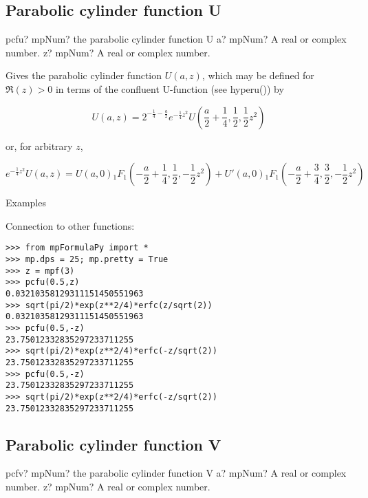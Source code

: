 \subsection{Parabolic cylinder function U}

\begin{mpFunctionsExtract}
	\mpFunctionTwo
	{pcfu? mpNum? the parabolic cylinder function U}
	{a? mpNum? A real or complex number.}
	{z? mpNum? A real or complex number.}	
\end{mpFunctionsExtract}


\vpara
Gives the parabolic cylinder function $U(a, z)$, which may be defined for $\Re(z)>0$ in terms of the confluent U-function (see hyperu()) by

\begin{equation}
U(a, z) = 2^{-\frac{1}{4}-\frac{a}{2}} e^{-\frac{1}{4}z^2} U\left(\frac{a}{2} + \frac{1}{4}, \frac{1}{2}, \frac{1}{2}z^2 \right)
\end{equation}

or, for arbitrary $z$,

\begin{equation}
e^{-\frac{1}{4}z^2} U(a, z) = U(a, 0) {}_1F_1\left(-\frac{a}{2} + \frac{1}{4}, \frac{1}{2}, -\frac{1}{2}z^2 \right) + U'(a, 0 ){}_1F_1\left(-\frac{a}{2} + \frac{3}{4}, \frac{3}{2}, -\frac{1}{2}z^2 \right)
\end{equation}


Examples

Connection to other functions:

\begin{lstlisting}
>>> from mpFormulaPy import *
>>> mp.dps = 25; mp.pretty = True
>>> z = mpf(3)
>>> pcfu(0.5,z)
0.03210358129311151450551963
>>> sqrt(pi/2)*exp(z**2/4)*erfc(z/sqrt(2))
0.03210358129311151450551963
>>> pcfu(0.5,-z)
23.75012332835297233711255
>>> sqrt(pi/2)*exp(z**2/4)*erfc(-z/sqrt(2))
23.75012332835297233711255
>>> pcfu(0.5,-z)
23.75012332835297233711255
>>> sqrt(pi/2)*exp(z**2/4)*erfc(-z/sqrt(2))
23.75012332835297233711255
\end{lstlisting}



\subsection{Parabolic cylinder function V}

\begin{mpFunctionsExtract}
	\mpFunctionTwo
	{pcfv? mpNum? the parabolic cylinder function V}
	{a? mpNum? A real or complex number.}
	{z? mpNum? A real or complex number.}	
\end{mpFunctionsExtract}


